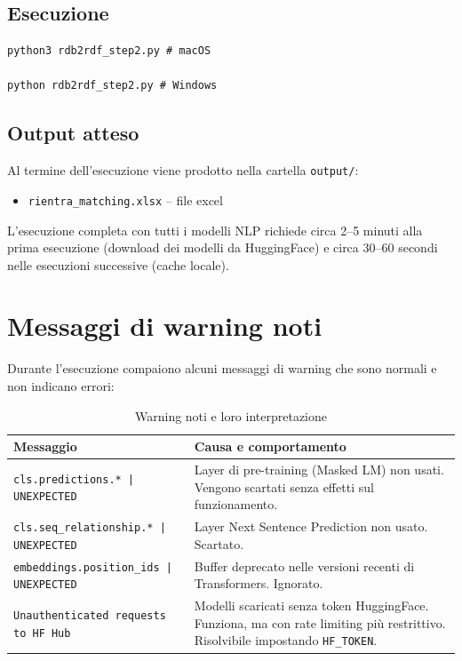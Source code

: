 \documentclass[12pt, a4paper]{report}
\begin{document}
\section{Esecuzione}

\begin{lstlisting}[caption={Avvio dello script}]
python3 rdb2rdf_step2.py # macOS

python rdb2rdf_step2.py # Windows
\end{lstlisting}

\section{Output atteso}

Al termine dell'esecuzione viene prodotto nella cartella
\texttt{output/}:

\begin{itemize}
  \item \texttt{rientra\_matching.xlsx} -- file excel 
\end{itemize}

L'esecuzione completa con tutti i modelli NLP richiede circa 2--5
minuti alla prima esecuzione (download dei modelli da HuggingFace) e
circa 30--60 secondi nelle esecuzioni successive (cache locale).

% 
\appendix
\chapter{Messaggi di warning noti}
% 

Durante l'esecuzione compaiono alcuni messaggi di warning che sono
normali e non indicano errori:

\begin{table}[H]
\centering
\begin{tabular}{p{6cm} p{8cm}}
\toprule
\textbf{Messaggio} & \textbf{Causa e comportamento} \\
\midrule
\texttt{cls.predictions.* | UNEXPECTED} &
Layer di pre-training (Masked LM) non usati. Vengono scartati senza
effetti sul funzionamento. \\[0.5em]
\texttt{cls.seq\_relationship.* | UNEXPECTED} &
Layer Next Sentence Prediction non usato. Scartato. \\[0.5em]
\texttt{embeddings.position\_ids | UNEXPECTED} &
Buffer deprecato nelle versioni recenti di Transformers. Ignorato. \\[0.5em]
\texttt{Unauthenticated requests to HF Hub} &
Modelli scaricati senza token HuggingFace. Funziona, ma con
rate limiting più restrittivo. Risolvibile impostando
\texttt{HF\_TOKEN}. \\
\bottomrule
\end{tabular}
\caption{Warning noti e loro interpretazione}
\end{table}
\end{document}

